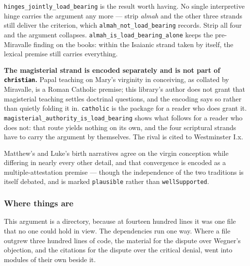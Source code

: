 \documentclass[11pt]{article}
\begin{document}
\texttt{hinges\_\allowbreak{}jointly\_\allowbreak{}load\_\allowbreak{}bearing} is the result worth having. No single interpretive hinge carries the argument any more — strip \emph{almah} and the other three strands still deliver the criterion, which \texttt{almah\_\allowbreak{}not\_\allowbreak{}load\_\allowbreak{}bearing} records. Strip all four and the argument collapses. \texttt{almah\_\allowbreak{}is\_\allowbreak{}load\_\allowbreak{}bearing\_\allowbreak{}alone} keeps the pre-Miravalle finding on the books: within the Isaianic strand taken by itself, the lexical premise still carries everything.

\textbf{The magisterial strand is encoded separately and is not part of \texttt{christian}.} Papal teaching on Mary's virginity in conceiving, as collated by Miravalle, is a Roman Catholic premise; this library's author does not grant that magisterial teaching settles doctrinal questions, and the encoding says so rather than quietly folding it in. \texttt{catholic} is the package for a reader who does grant it. \texttt{magisterial\_\allowbreak{}authority\_\allowbreak{}is\_\allowbreak{}load\_\allowbreak{}bearing} shows what follows for a reader who does not: that route yields nothing on its own, and the four scriptural strands have to carry the argument by themselves. The rival is cited to Westminster I.x.

Matthew's and Luke's birth narratives agree on the virgin conception while differing in nearly every other detail, and that convergence is encoded as a multiple-attestation premise — though the independence of the two traditions is itself debated, and is marked \texttt{plausible} rather than \texttt{well\allowbreak{}Supported}.

\subsubsection*{Where things are}
This argument is a directory, because at fourteen hundred lines it was one file that no one could hold in view. The dependencies run one way. Where a file outgrew three hundred lines of code, the material for the dispute over Wegner's objection, and the citations for the dispute over the critical denial, went into modules of their own beside it.
\end{document}
